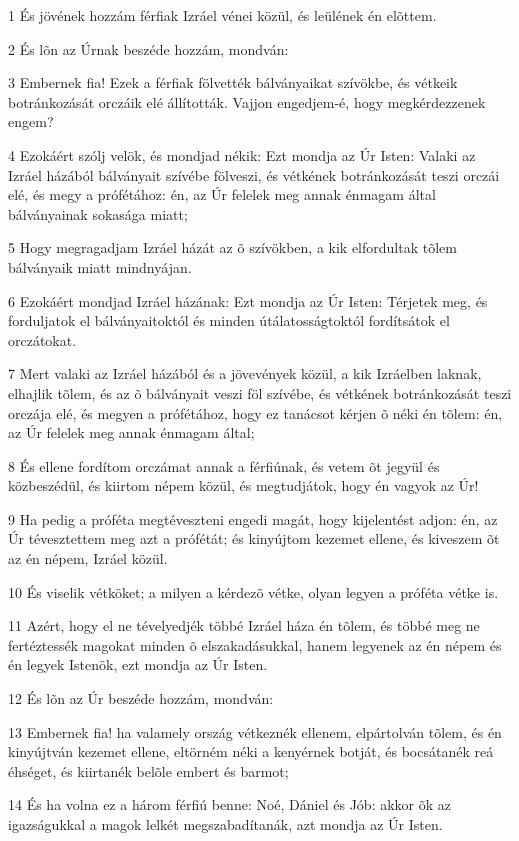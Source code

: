 \par 1 És jövének hozzám férfiak Izráel vénei közül, és leülének én elõttem.
\par 2 És lõn az Úrnak beszéde hozzám, mondván:
\par 3 Embernek fia! Ezek a férfiak fölvették bálványaikat szívökbe, és vétkeik botránkozását orczáik elé állították. Vajjon engedjem-é, hogy megkérdezzenek engem?
\par 4 Ezokáért szólj velök, és mondjad nékik: Ezt mondja az Úr Isten: Valaki az Izráel házából bálványait szívébe fölveszi, és vétkének botránkozását teszi orczái elé, és megy a prófétához: én, az Úr felelek meg annak énmagam által bálványainak sokasága miatt;
\par 5 Hogy megragadjam Izráel házát az õ szívökben, a kik elfordultak tõlem bálványaik miatt mindnyájan.
\par 6 Ezokáért mondjad Izráel házának: Ezt mondja az Úr Isten: Térjetek meg, és forduljatok el bálványaitoktól és minden útálatosságtoktól fordítsátok el orczátokat.
\par 7 Mert valaki az Izráel házából és a jövevények közül, a kik Izráelben laknak, elhajlik tõlem, és az õ bálványait veszi föl szívébe, és vétkének botránkozását teszi orczája elé, és megyen a prófétához, hogy ez tanácsot kérjen õ néki én tõlem: én, az Úr felelek meg annak énmagam által;
\par 8 És ellene fordítom orczámat annak a férfiúnak, és vetem õt jegyül és közbeszédül,  és kiirtom népem közül, és megtudjátok, hogy én vagyok az Úr!
\par 9 Ha pedig a próféta megtéveszteni engedi magát, hogy kijelentést adjon: én, az Úr tévesztettem meg azt a prófétát; és kinyújtom kezemet ellene, és kiveszem õt  az én népem, Izráel közül.
\par 10 És viselik vétköket; a milyen a kérdezõ vétke, olyan legyen a próféta vétke is.
\par 11 Azért, hogy el ne tévelyedjék többé Izráel háza én tõlem, és többé meg ne fertéztessék magokat minden õ elszakadásukkal, hanem legyenek az én népem és én legyek Istenök, ezt mondja az Úr Isten.
\par 12 És lõn az Úr beszéde hozzám, mondván:
\par 13 Embernek fia! ha valamely ország vétkeznék ellenem, elpártolván tõlem, és én kinyújtván kezemet ellene, eltörném néki a kenyérnek botját, és bocsátanék reá éhséget, és kiirtanék belõle embert és barmot;
\par 14 És ha volna ez a három férfiú benne: Noé, Dániel és Jób: akkor õk az igazságukkal a magok lelkét megszabadítanák, azt mondja az Úr Isten.
